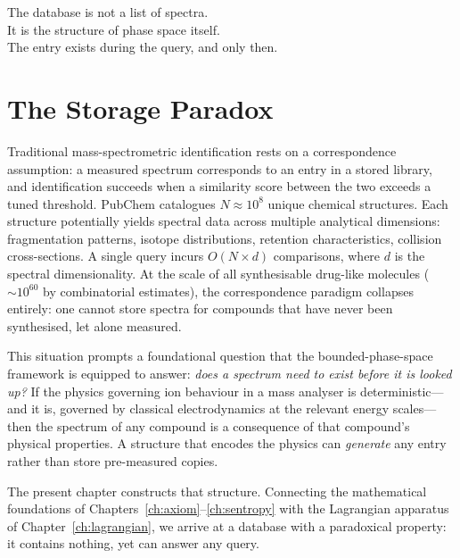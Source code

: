 
\epigraph{%
  The database is not a list of spectra.\\
  It is the structure of phase space itself.\\
  The entry exists during the query, and only then.%
}{}

\section{The Storage Paradox}
\label{sec:ch23-paradox}

Traditional mass-spectrometric identification rests on a correspondence
assumption: a measured spectrum corresponds to an entry in a stored library,
and identification succeeds when a similarity score between the two exceeds a
tuned threshold.  PubChem catalogues $N \approx 10^8$ unique chemical
structures.  Each structure potentially yields spectral data across multiple
analytical dimensions: fragmentation patterns, isotope distributions, retention
characteristics, collision cross-sections.  A single query incurs
$O(N \times d)$ comparisons, where $d$ is the spectral dimensionality.  At
the scale of all synthesisable drug-like molecules ($\sim 10^{60}$ by
combinatorial estimates), the correspondence paradigm collapses entirely: one
cannot store spectra for compounds that have never been synthesised, let alone
measured.

This situation prompts a foundational question that the bounded-phase-space
framework is equipped to answer: \emph{does a spectrum need to exist before it
is looked up?}  If the physics governing ion behaviour in a mass analyser is
deterministic---and it is, governed by classical electrodynamics at the
relevant energy scales---then the spectrum of any compound is a consequence of
that compound's physical properties.  A structure that encodes the physics can
\emph{generate} any entry rather than store pre-measured copies.

The present chapter constructs that structure.  Connecting the mathematical
foundations of Chapters~\ref{ch:axiom}--\ref{ch:sentropy} with the Lagrangian
apparatus of Chapter~\ref{ch:lagrangian}, we arrive at a database with a
paradoxical property: it contains nothing, yet can answer any query.

